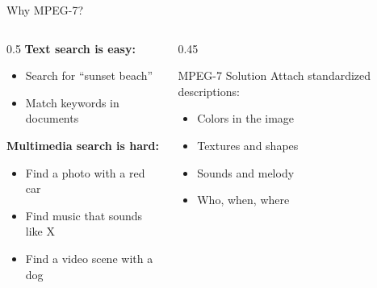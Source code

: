 \documentclass[aspectratio=169,12pt]{beamer}
\begin{document}
\begin{frame}{Why MPEG-7?}
    \begin{columns}
        \begin{column}{0.5\textwidth}
            \textbf{Text search is easy:}
            \begin{itemize}
                \item Search for ``sunset beach''
                \item Match keywords in documents
            \end{itemize}
            
            \vspace{0.2cm}
            \textbf{Multimedia search is hard:}
            \begin{itemize}
                \item Find a photo with a red car
                \item Find music that sounds like X
                \item Find a video scene with a dog
            \end{itemize}
        \end{column}
        \begin{column}{0.45\textwidth}
            \begin{block}{MPEG-7 Solution}
                Attach standardized descriptions:
                \begin{itemize}
                    \item Colors in the image
                    \item Textures and shapes
                    \item Sounds and melody
                    \item Who, when, where
                \end{itemize}
            \end{block}
        \end{column}
    \end{columns}
\end{frame}
\end{document}
